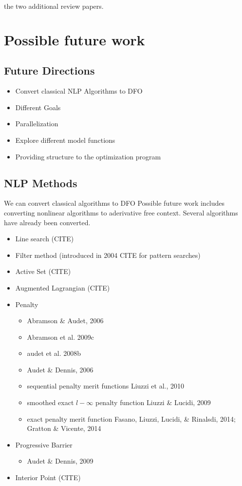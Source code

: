 \documentclass{article}
\begin{document}
the two additional review papers.



\section{Possible future work}

\subsection{Future Directions}

\begin{itemize}
\item Convert classical NLP Algorithms to DFO
\item Different Goals
\item Parallelization
\item Explore different model functions
\item Providing structure to the optimization program
\end{itemize}


\subsection{NLP Methods}

We can convert classical algorithms to DFO
Possible future work includes converting nonlinear algorithms to  aderivative free context.
Several algorithms have already been converted.

\begin{itemize}
	\item Line search (CITE)
	\item Filter method (introduced in 2004 CITE for pattern searches)
	\item Active Set (CITE)
	\item Augmented Lagrangian (CITE)
	\item Penalty
	\begin{itemize}
		\item Abramson \& Audet, 2006
		\item Abramson et al. 2009c
		\item audet et al. 2008b
		\item Audet \& Dennis, 2006
		\item sequential penalty merit functions Liuzzi et al., 2010
		\item smoothed exact $l-\infty$ penalty function Liuzzi \& Lucidi, 2009
		\item exact penalty merit function Fasano, Liuzzi, Lucidi, \& Rinalsdi, 2014; Gratton \& Vicente, 2014
	\end{itemize}
	\item Progressive Barrier
	\begin{itemize}
		\item Audet \& Dennis, 2009
	\end{itemize}
	\item Interior Point (CITE)
\end{itemize}
\end{document}
